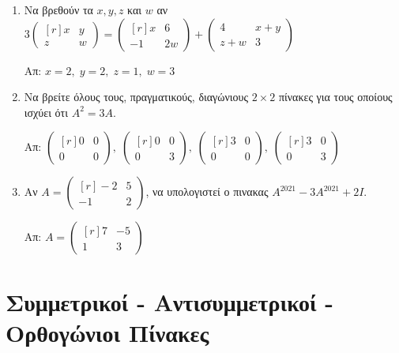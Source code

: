 \begin{enumerate}
\item Να βρεθούν τα $ x,y, z $ και $ w $ αν $ 3 
  \begin{pmatrix*}[r]
    x & y \\
    z &w
  \end{pmatrix*} = 
  \begin{pmatrix*}[r]
    x & 6 \\
    -1 & 2w
  \end{pmatrix*} + 
  \begin{pmatrix*}
    4 & x+y \\
    z+w & 3
  \end{pmatrix*} $ 

  \hfill Απ: $ x=2, \; y=2, \; z=1, \; w=3 $ 

\item Να βρείτε όλους τους, πραγματικούς, διαγώνιους $ 2 \times 2 $ πίνακες για τους 
  οποίους ισχύει ότι $ A^{2}=3A $.

  \hfill Απ: $\scriptstyle{ 
  \begin{pmatrix*}[r]
    0 & 0 \\
    0 &0
  \end{pmatrix*}, \; 
  \begin{pmatrix*}[r]
    0 & 0 \\
    0 & 3
  \end{pmatrix*}, \; 
  \begin{pmatrix*}[r]
    3 & 0 \\
    0 & 0
  \end{pmatrix*}, \; 
  \begin{pmatrix*}[r]
    3 & 0 \\
    0 & 3
\end{pmatrix*}} $
  

\item Αν $ A = 
  \begin{pmatrix*}[r]
    -2 & 5 \\
    -1 & 2
  \end{pmatrix*} $, να υπολογιστεί ο πινακας $ A^{2021} - 3A^{2021} +2I $. 

  \hfill Απ: $ A = 
  \begin{pmatrix*}[r]
    7 & -5 \\
    1 & 3
  \end{pmatrix*} $ 
\end{enumerate}

\section*{Συμμετρικοί - Αντισυμμετρικοί - Ορθογώνιοι Πίνακες}


